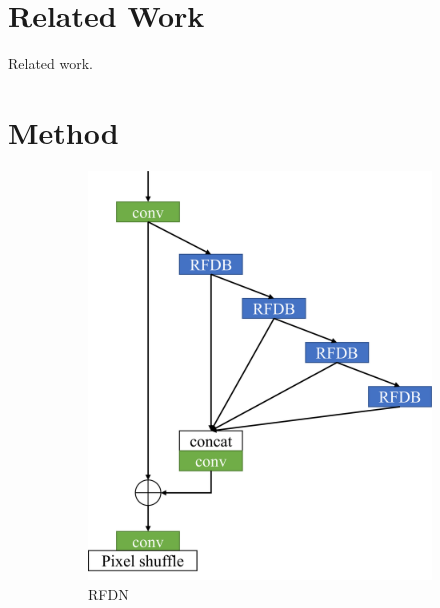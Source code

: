 \documentclass[10pt,twocolumn,letterpaper]{article}
\begin{document}
\section{Related Work}
\label{sec:related}

Related work.


\section{Method}
\label{sec:method}

\begin{figure}
    \centering
    \begin{subfigure}[b]{0.49\linewidth}
		\centering
        \includegraphics[width=\textwidth]{../RFDN.pdf}
        \caption{RFDN}
        \label{fig:RFDN}
    \end{subfigure}
    \begin{subfigure}[b]{0.49\linewidth}
		\centering

\end{subfigure}
\end{figure}
\end{document}
